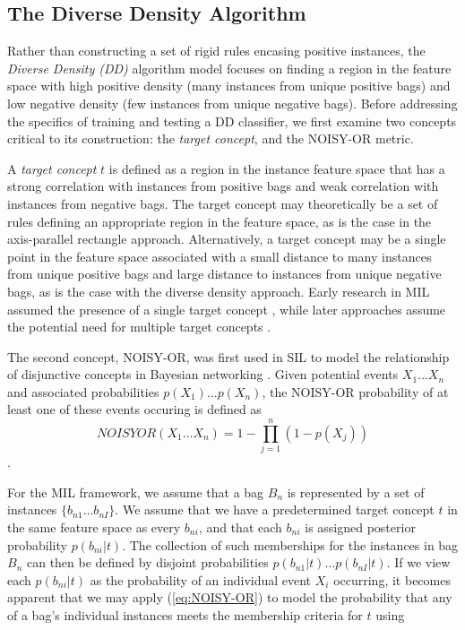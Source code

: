 \documentclass[12pt,dvips]{report}
\numberwithin{equation}{section}
\begin{document}
\subsection{The Diverse Density Algorithm} \label{subsec:RelatedWorkDD}

Rather than constructing a set of rigid rules encasing positive instances, the \emph{Diverse Density (DD)} algorithm \cite{maro98} model focuses on finding a region in the feature space with high positive density (many instances from unique positive bags) and low negative density (few instances from unique negative bags). Before addressing the specifics of training and testing a DD classifier, we first examine two concepts critical to its construction: the \emph{target concept}, and the NOISY-OR metric.

A \emph{target concept} $t$ is defined as a region in the instance feature space that has a strong correlation with instances from positive bags and weak correlation with instances from negative bags. The target concept may theoretically be a set of rules defining an appropriate region in the feature space, as is the case in the axis-parallel rectangle approach. Alternatively, a target concept may be a single point in the feature space associated with a small distance to many instances from unique positive bags and large distance to instances from unique negative bags, as is the case with the diverse density approach. Early research in MIL assumed the presence of a single target concept \cite{maro98,bolt11}, while later approaches assume the potential need for multiple target concepts \cite{chen06_miles,bolt11}.

The second concept, NOISY-OR, was first used in SIL to model the relationship of disjunctive concepts in Bayesian networking \cite{srin93}. Given potential events $X_{1}\ldots X_{n}$ and associated probabilities $p(X_{1})\ldots p(X_{n})$, the NOISY-OR probability of at least one of these events occuring is defined as \begin{equation} NOISYOR(X_{1}\ldots X_{n})=1-\prod_{j=1}^{n}(1-p(X_{j}))\label{eq:NOISY-OR} \end{equation}.


For the MIL framework, we assume that a bag $B_{n}$ is represented by a set of instances $\{b_{n1}\ldots b_{nI}\}$. We assume that we have a predetermined target concept $t$ in the same feature space as every $b_{ni}$, and that each $b_{ni}$ is assigned posterior probability $p(b_{ni}\vert t)$. The collection of such memberships for the instances in bag $B_{n}$ can then be defined by disjoint probabilities $p(b_{n1}\vert t)\ldots p(b_{nI}\vert t)$. If we view each $p(b_{ni}\vert t)$ as the probability of an individual event $X_{i}$ occurring, it becomes apparent that we may apply (\ref{eq:NOISY-OR}) to model the probability that any of a bag's individual instances meets the membership criteria for $t$ using
\end{document}
